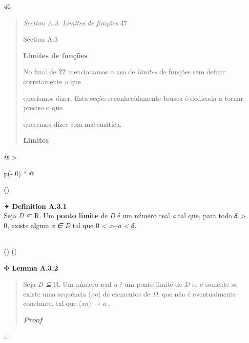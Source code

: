 \documentclass[
]{article}
\begin{document}
46

\begin{quote}
\emph{Section A.3. Limites de funções} 47

Section A.3

\textbf{Limites de funções}

No final de \textbf{??} mencionamos o uso de \emph{limites} de funções
sem definir corretamente o que

queríamos dizer. Esta seção reconhecidamente brusca é dedicada a tornar
preciso o que

queremos dizer com matemática.

\textbf{Limites}
\end{quote}

\begin{longtable}[]{@{}
  >{\raggedright\arraybackslash}p{(\columnwidth - 0\tabcolsep) * }@{}}
\toprule()
\begin{minipage}[b]{\linewidth}\raggedright
✦ \textbf{Definition A.3.1}\\
Seja \emph{D ⊆} R. Um \textbf{ponto limite} de \emph{D} é um número real
\emph{a} tal que, para todo \emph{δ \textgreater{}} 0, existe algum
\emph{x ∈ D} tal que 0 \emph{\textless{} \textbar x−a\textbar{}
\textless{} δ}.\strut
\end{minipage} \\
\midrule()
\endhead
\bottomrule()
\end{longtable}

✣ \textbf{Lemma A.3.2}

\begin{quote}
Seja \emph{D ⊆} R. Um número real \emph{a} é um ponto limite de \emph{D}
se e somente se existe uma sequência (\emph{xn}) de elementos de
\emph{D}, que não é eventualmente constante, tal que (\emph{xn}) \emph{→
a} .

\emph{\textbf{Proof}}
\end{quote}

□
\end{document}
